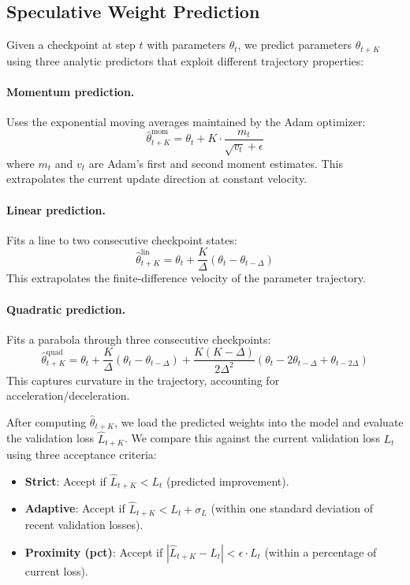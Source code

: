 \documentclass{article}
\begin{document}
\subsection{Speculative Weight Prediction}
\label{sec:prediction}

Given a checkpoint at step $t$ with parameters $\theta_t$, we predict parameters $\theta_{t+K}$ using three analytic predictors that exploit different trajectory properties:

\paragraph{Momentum prediction.}
Uses the exponential moving averages maintained by the Adam optimizer:
\begin{equation}
    \hat{\theta}_{t+K}^{\text{mom}} = \theta_t + K \cdot \frac{m_t}{\sqrt{v_t} + \epsilon}
\end{equation}
where $m_t$ and $v_t$ are Adam's first and second moment estimates.
This extrapolates the current update direction at constant velocity.

\paragraph{Linear prediction.}
Fits a line to two consecutive checkpoint states:
\begin{equation}
    \hat{\theta}_{t+K}^{\text{lin}} = \theta_t + \frac{K}{\Delta}(\theta_t - \theta_{t-\Delta})
\end{equation}
This extrapolates the finite-difference velocity of the parameter trajectory.

\paragraph{Quadratic prediction.}
Fits a parabola through three consecutive checkpoints:
\begin{equation}
    \hat{\theta}_{t+K}^{\text{quad}} = \theta_t + \frac{K}{\Delta}(\theta_t - \theta_{t-\Delta}) + \frac{K(K-\Delta)}{2\Delta^2}(\theta_t - 2\theta_{t-\Delta} + \theta_{t-2\Delta})
\end{equation}
This captures curvature in the trajectory, accounting for acceleration/deceleration.

After computing $\hat{\theta}_{t+K}$, we load the predicted weights into the model and evaluate the validation loss $\hat{L}_{t+K}$.
We compare this against the current validation loss $L_t$ using three acceptance criteria:
\begin{itemize}
    \item \textbf{Strict}: Accept if $\hat{L}_{t+K} < L_t$ (predicted improvement).
    \item \textbf{Adaptive}: Accept if $\hat{L}_{t+K} < L_t + \sigma_L$ (within one standard deviation of recent validation losses).
    \item \textbf{Proximity (pct)}: Accept if $|\hat{L}_{t+K} - L_t| < \epsilon \cdot L_t$ (within a percentage of current loss).
\end{itemize}
\end{document}
